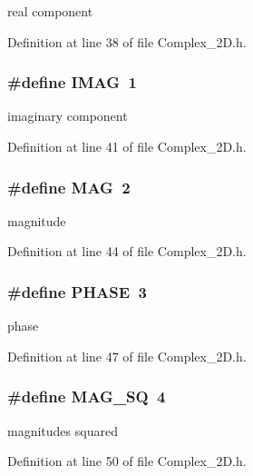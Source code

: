real component 

Definition at line 38 of file Complex\_\-2D.h.
\subsubsection{\setlength{\rightskip}{0pt plus 5cm}\#define IMAG~1}\label{Complex__2D_8h_24b8c551ca667dbb67122d694fb9b2e8}


imaginary component 

Definition at line 41 of file Complex\_\-2D.h.
\subsubsection{\setlength{\rightskip}{0pt plus 5cm}\#define MAG~2}\label{Complex__2D_8h_c58faf2647b4a054cdacba0191bd5c99}


magnitude 

Definition at line 44 of file Complex\_\-2D.h.
\subsubsection{\setlength{\rightskip}{0pt plus 5cm}\#define PHASE~3}\label{Complex__2D_8h_c0e9e3be78e0764ea150d8fb130bd033}


phase 

Definition at line 47 of file Complex\_\-2D.h.
\subsubsection{\setlength{\rightskip}{0pt plus 5cm}\#define MAG\_\-SQ~4}\label{Complex__2D_8h_3a8bc81c6212a1fa55d017066cb1af7d}


magnitudes squared 

Definition at line 50 of file Complex\_\-2D.h.